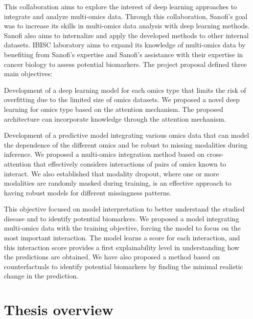 \documentclass[../main.tex]{subfiles}
\begin{document}
	This collaboration aims to explore the interest of deep learning approaches to integrate and analyze multi-omics data.
	Through this collaboration, Sanofi's goal was to increase its skills in multi-omics data analysis with deep learning methods.
	Sanofi also aims to internalize and apply the developed methods to other internal datasets.
	IBISC laboratory aims to expand its knowledge of multi-omics data by benefiting from Sanofi's expertise and Sanofi's assistance with their expertise in cancer biology to assess potential biomarkers.
	The project proposal defined three main objectives:
	\begin{description}[
			style=multiline,
			leftmargin=!,
			labelwidth=2cm
		]
		\item[First objective]
			Development of a deep learning model for each omics type that limits the risk of overfitting due to the limited size of omics datasets.
			We proposed a novel deep learning for omics type based on the attention mechanism.
			The proposed architecture can incorporate knowledge through the attention mechanism.
		\item[Second objective]
			Development of a predictive model integrating various omics data that can model the dependence of the different omics and be robust to missing modalities during inference.
			We proposed a multi-omics integration method based on cross-attention that effectively considers interactions of pairs of omics known to interact.
			We also established that modality dropout, where one or more modalities are randomly masked during training, is an effective approach to having robust models for different missingness patterns.
		\item[Third objective]
			This objective focused on model interpretation to better understand the studied disease and to identify potential biomarkers.
			We proposed a model integrating multi-omics data with the training objective, forcing the model to focus on the most important interaction.
			The model learns a score for each interaction, and this interaction score provides a first explainability level in understanding how the predictions are obtained.
			We have also proposed a method based on counterfactuals to identify potential biomarkers by finding the minimal realistic change in the prediction.
	\end{description}

\section{Thesis overview}
	\begin{center}
		\vspace{-2\baselineskip}
		\ifSubfilesClassLoaded{%
		}{
		}
	\end{center}

\end{document}
